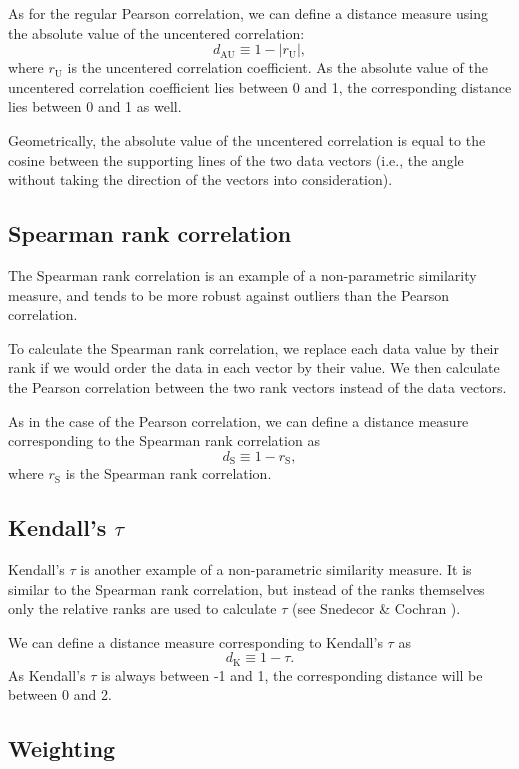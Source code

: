 \documentclass{report}
\begin{document}
As for the regular Pearson correlation, we can define a distance measure using the absolute value of the uncentered correlation:
$$d_{\mbox{AU}} \equiv 1 - \left|r_{\mbox{U}}\right|,$$
where
$r_{\mbox{U}}$
is the uncentered correlation coefficient. As the absolute value of the uncentered correlation coefficient lies between 0 and 1, the corresponding distance lies between 0 and 1 as well.

Geometrically, the absolute value of the uncentered correlation is equal to the cosine between the supporting lines of the two data vectors (i.e., the angle without taking the direction of the vectors into consideration).

\subsection*{Spearman rank correlation}

The Spearman rank correlation is an example of a non-parametric similarity measure, and tends to be more robust against outliers than the Pearson correlation.

To calculate the Spearman rank correlation, we replace each data value by their rank if we would order the data in each vector by their value. We then calculate the Pearson correlation between the two rank vectors instead of the data vectors.

As in the case of the Pearson correlation, we can define a distance measure corresponding to the Spearman rank correlation as
$$d_{\mbox{S}} \equiv 1 - r_{\mbox{S}},$$
where
$r_{\mbox{S}}$
is the Spearman rank correlation.

\subsection*{Kendall's $\tau$}

Kendall's $\tau$
is another example of a non-parametric similarity measure. It is similar to the Spearman rank correlation, but instead of the ranks themselves only the relative ranks are used to calculate $\tau$ (see Snedecor \& Cochran \cite{snedecor1989}).

We can define a distance measure corresponding to Kendall's $\tau$
as $$d_{\mbox{K}} \equiv 1 - \tau.$$
As Kendall's $\tau$ is always between -1 and 1, the corresponding distance will be between 0 and 2.

\subsection*{Weighting}
\end{document}
